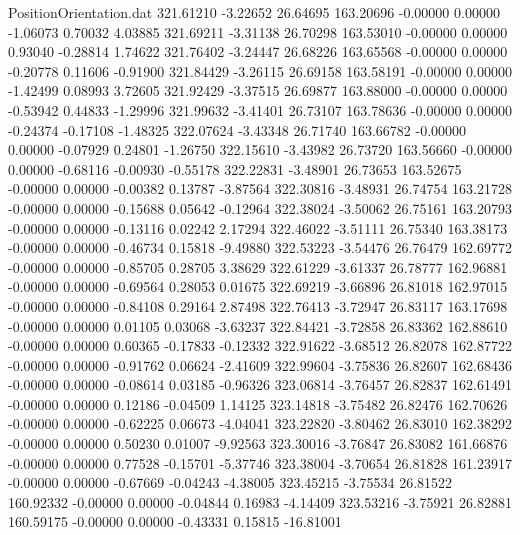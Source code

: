 \begin{filecontents}{PositionOrientation.dat}
 321.61210   -3.22652   26.64695   163.20696   -0.00000    0.00000   -1.06073    0.70032    4.03885
 321.69211   -3.31138   26.70298   163.53010   -0.00000    0.00000    0.93040   -0.28814    1.74622
 321.76402   -3.24447   26.68226   163.65568   -0.00000    0.00000   -0.20778    0.11606   -0.91900
 321.84429   -3.26115   26.69158   163.58191   -0.00000    0.00000   -1.42499    0.08993    3.72605
 321.92429   -3.37515   26.69877   163.88000   -0.00000    0.00000   -0.53942    0.44833   -1.29996
 321.99632   -3.41401   26.73107   163.78636   -0.00000    0.00000   -0.24374   -0.17108   -1.48325
 322.07624   -3.43348   26.71740   163.66782   -0.00000    0.00000   -0.07929    0.24801   -1.26750
 322.15610   -3.43982   26.73720   163.56660   -0.00000    0.00000   -0.68116   -0.00930   -0.55178
 322.22831   -3.48901   26.73653   163.52675   -0.00000    0.00000   -0.00382    0.13787   -3.87564
 322.30816   -3.48931   26.74754   163.21728   -0.00000    0.00000   -0.15688    0.05642   -0.12964
 322.38024   -3.50062   26.75161   163.20793   -0.00000    0.00000   -0.13116    0.02242    2.17294
 322.46022   -3.51111   26.75340   163.38173   -0.00000    0.00000   -0.46734    0.15818   -9.49880
 322.53223   -3.54476   26.76479   162.69772   -0.00000    0.00000   -0.85705    0.28705    3.38629
 322.61229   -3.61337   26.78777   162.96881   -0.00000    0.00000   -0.69564    0.28053    0.01675
 322.69219   -3.66896   26.81018   162.97015   -0.00000    0.00000   -0.84108    0.29164    2.87498
 322.76413   -3.72947   26.83117   163.17698   -0.00000    0.00000    0.01105    0.03068   -3.63237
 322.84421   -3.72858   26.83362   162.88610   -0.00000    0.00000    0.60365   -0.17833   -0.12332
 322.91622   -3.68512   26.82078   162.87722   -0.00000    0.00000   -0.91762    0.06624   -2.41609
 322.99604   -3.75836   26.82607   162.68436   -0.00000    0.00000   -0.08614    0.03185   -0.96326
 323.06814   -3.76457   26.82837   162.61491   -0.00000    0.00000    0.12186   -0.04509    1.14125
 323.14818   -3.75482   26.82476   162.70626   -0.00000    0.00000   -0.62225    0.06673   -4.04041
 323.22820   -3.80462   26.83010   162.38292   -0.00000    0.00000    0.50230    0.01007   -9.92563
 323.30016   -3.76847   26.83082   161.66876   -0.00000    0.00000    0.77528   -0.15701   -5.37746
 323.38004   -3.70654   26.81828   161.23917   -0.00000    0.00000   -0.67669   -0.04243   -4.38005
 323.45215   -3.75534   26.81522   160.92332   -0.00000    0.00000   -0.04844    0.16983   -4.14409
 323.53216   -3.75921   26.82881   160.59175   -0.00000    0.00000   -0.43331    0.15815  -16.81001

\end{filecontents}
